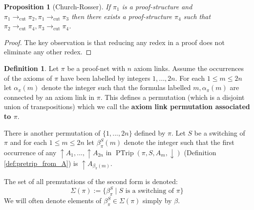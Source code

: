 \documentclass[12pt]{article}
\theoremstyle{plain}
\newtheorem{proposition}[thm]{Proposition}
\theoremstyle{definition}
\newtheorem{defn}[thm]{Definition} %
\newcommand{\lto}{\longrightarrow}
\begin{document}
\begin{proposition}[Church-Rosser]\label{prop:church_rosser}
If $\pi_1$ is a proof-structure and $\pi_1 \lto_{\operatorname{cut}} \pi_2, \pi_1 \lto_{\operatorname{cut}} \pi_3$ then there exists a proof-structure $\pi_4$ such that $\pi_2 \lto_{\operatorname{cut}} \pi_4, \pi_3 \lto_{\operatorname{cut}} \pi_4$.
\end{proposition}
\begin{proof}
The key observation is that reducing any redex in a proof does not eliminate any other redex.
\end{proof}
\begin{defn}\label{def:permutations}
Let $\pi$ be a proof-net with $n$ axiom links. Assume the occurrences of the axioms of $\pi$ have been labelled by integers $1,...,2n$. For each $1 \leq m \leq 2n$ let $\alpha_{\pi}(m)$ denote the integer such that the formulas labelled $m,\alpha_{\pi}(m)$ are connected by an axiom link in $\pi$. This defines a permutation (which is a disjoint union of transpositions) which we call the \textbf{axiom link permutation associated to $\pi$}.

There is another permutation of $\lbrace 1,...,2n\rbrace$ defined by $\pi$. Let $S$ be a switching of $\pi$ and for each $1 \leq m \leq 2n$ let $\beta_{\pi}^S(m)$ denote the integer such that the first occurrence of any $\uparrow A_1,...,\uparrow A_{2n}$ in $\operatorname{PTrip}(\pi,S,A_m,\downarrow)$ (Definition \ref{def:pretrip_from_A}) is $\uparrow A_{\beta_{\pi}(m)}$.

The set of all premutations of the second form is denoted:
\begin{equation}
    \Sigma(\pi) := \lbrace \beta_{\pi}^S \mid S\text{ is a switching of }\pi\rbrace
\end{equation}
We will often denote elements of $\beta_{\pi}^S \in \Sigma(\pi)$ simply by $\beta$.
\end{defn}
\end{document}
